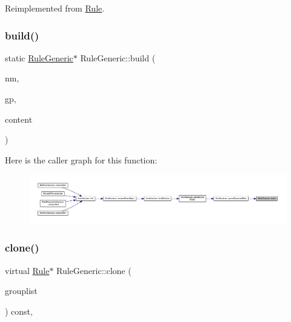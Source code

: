 Reimplemented from \mbox{\hyperlink{class_rule_a4e3e61f066670175009f60fb9dc60848}{Rule}}.

\mbox{\label{class_rule_generic_a19c6f4513d1efe03ed91342c2c83001e}} 
\subsubsection{\texorpdfstring{build()}{build()}}
{\footnotesize\ttfamily static \mbox{\hyperlink{class_rule_generic}{Rule\+Generic}}$\ast$ Rule\+Generic\+::build (\begin{DoxyParamCaption}\item[{const string \&}]{nm,  }\item[{const string \&}]{gp,  }\item[{const string \&}]{content }\end{DoxyParamCaption})\hspace{0.3cm}{\ttfamily [static]}}

Here is the caller graph for this function\+:
\nopagebreak
\begin{figure}[H]
\begin{center}
\leavevmode
\includegraphics[width=350pt]{class_rule_generic_a19c6f4513d1efe03ed91342c2c83001e_icgraph}
\end{center}
\end{figure}
\mbox{\label{class_rule_generic_a98b2f92f8bcfebd473dd4e27fd183815}} 
\subsubsection{\texorpdfstring{clone()}{clone()}}
{\footnotesize\ttfamily virtual \mbox{\hyperlink{class_rule}{Rule}}$\ast$ Rule\+Generic\+::clone (\begin{DoxyParamCaption}\item[{const \mbox{\hyperlink{class_action_group_list}{Action\+Group\+List}} \&}]{grouplist }\end{DoxyParamCaption}) const\hspace{0.3cm}{\ttfamily [inline]}, {\ttfamily [virtual]}}




